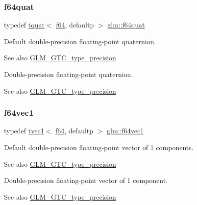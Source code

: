 \subsubsection{\texorpdfstring{f64quat}{f64quat}}
{\footnotesize\ttfamily typedef \hyperlink{structglm_1_1tquat}{tquat}$<$ \hyperlink{group__gtc__type__precision_ga2bba392e555124b36cde6abba349bab3}{f64}, defaultp $>$ \hyperlink{group__gtc__type__precision_ga5b54d7b36fbee5e271f73e6ed74e7172}{glm\+::f64quat}}

Default double-\/precision floating-\/point quaternion. \begin{DoxySeeAlso}{See also}
\hyperlink{group__gtc__type__precision}{G\+L\+M\+\_\+\+G\+T\+C\+\_\+type\+\_\+precision}
\end{DoxySeeAlso}
Double-\/precision floating-\/point quaternion. \begin{DoxySeeAlso}{See also}
\hyperlink{group__gtc__type__precision}{G\+L\+M\+\_\+\+G\+T\+C\+\_\+type\+\_\+precision} 
\end{DoxySeeAlso}
\mbox{\label{group__gtc__type__precision_ga4c945cd13adbebd25ea3df003efb92ef}} 
\subsubsection{\texorpdfstring{f64vec1}{f64vec1}}
{\footnotesize\ttfamily typedef \hyperlink{structglm_1_1tvec1}{tvec1}$<$ \hyperlink{group__gtc__type__precision_ga2bba392e555124b36cde6abba349bab3}{f64}, defaultp $>$ \hyperlink{group__gtc__type__precision_ga4c945cd13adbebd25ea3df003efb92ef}{glm\+::f64vec1}}

Default double-\/precision floating-\/point vector of 1 components. \begin{DoxySeeAlso}{See also}
\hyperlink{group__gtc__type__precision}{G\+L\+M\+\_\+\+G\+T\+C\+\_\+type\+\_\+precision}
\end{DoxySeeAlso}
Double-\/precision floating-\/point vector of 1 component. \begin{DoxySeeAlso}{See also}
\hyperlink{group__gtc__type__precision}{G\+L\+M\+\_\+\+G\+T\+C\+\_\+type\+\_\+precision} 
\end{DoxySeeAlso}
\mbox{\label{group__gtc__type__precision_gacde4fe7b129521888cd30672c34650c5}} 
